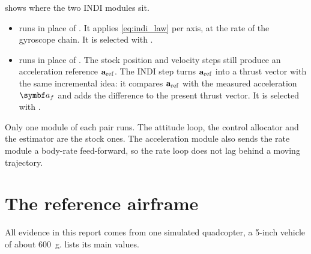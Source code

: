 
 shows where the two INDI modules sit.
\begin{itemize}
  \item {} runs in place of .
    It applies \cref{eq:indi_law} per axis, at the rate of the gyroscope chain.
    It is selected with .
  \item {} runs in place of .
    The stock position and velocity steps still produce an acceleration reference $\mathbf{a}_{\mathrm{ref}}$.
    The INDI step turns $\mathbf{a}_{\mathrm{ref}}$ into a thrust vector with the same incremental idea: it compares $\mathbf{a}_{\mathrm{ref}}$ with the measured acceleration $\vect{a}_f$ and adds the difference to the present thrust vector.
    It is selected with .
\end{itemize}
Only one module of each pair runs.
The attitude loop, the control allocator and the estimator are the stock ones.
The acceleration module also sends the rate module a body-rate feed-forward, so the rate loop does not lag behind a moving trajectory.

\section{The reference airframe}\label{sec:airframe}

All evidence in this report comes from one simulated quadcopter, a 5-inch vehicle of about 600~g.
 lists its main values.


